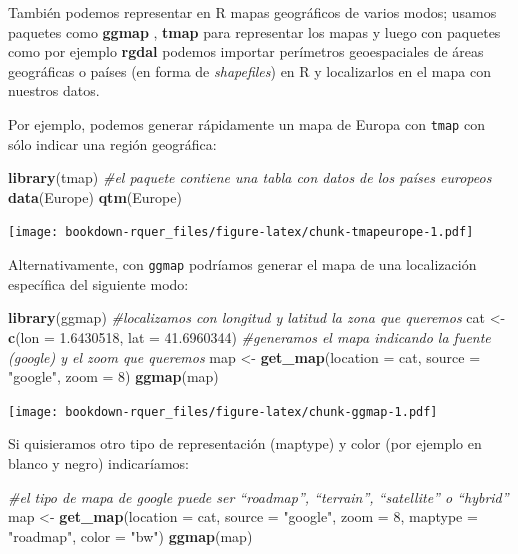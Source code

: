 \documentclass[]{book}
\newenvironment{Shaded}{\begin{snugshade}}{\end{snugshade}}
\newcommand{\CommentTok}[1]{\textcolor[rgb]{0.56,0.35,0.01}{\textit{#1}}}
\newcommand{\DataTypeTok}[1]{\textcolor[rgb]{0.13,0.29,0.53}{#1}}
\newcommand{\DecValTok}[1]{\textcolor[rgb]{0.00,0.00,0.81}{#1}}
\newcommand{\FloatTok}[1]{\textcolor[rgb]{0.00,0.00,0.81}{#1}}
\newcommand{\KeywordTok}[1]{\textcolor[rgb]{0.13,0.29,0.53}{\textbf{#1}}}
\newcommand{\NormalTok}[1]{#1}
\newcommand{\StringTok}[1]{\textcolor[rgb]{0.31,0.60,0.02}{#1}}
\theoremstyle{definition}
\theoremstyle{definition}
\theoremstyle{definition}
\theoremstyle{remark}
\begin{document}
También podemos representar en R mapas geográficos de varios modos;
usamos paquetes como \textbf{ggmap} \citep{R-ggmap}, \textbf{tmap}
\citep{R-tmap} para representar los mapas y luego con paquetes como por
ejemplo \textbf{rgdal} \citep{R-rgdal} podemos importar perímetros
geoespaciales de áreas geográficas o países (en forma de
\emph{shapefiles}) en R y localizarlos en el mapa con nuestros datos.

Por ejemplo, podemos generar rápidamente un mapa de Europa con
\texttt{tmap} con sólo indicar una región geográfica:

\begin{Shaded}
\begin{Highlighting}[]
\KeywordTok{library}\NormalTok{(tmap)}
\CommentTok{#el paquete contiene una tabla con datos de los países europeos }
\KeywordTok{data}\NormalTok{(Europe)}
\KeywordTok{qtm}\NormalTok{(Europe)}
\end{Highlighting}
\end{Shaded}

\texttt{[image: bookdown-rquer\_files/figure-latex/chunk-tmapeurope-1.pdf]}

Alternativamente, con \texttt{ggmap} podríamos generar el mapa de una
localización específica del siguiente modo:

\begin{Shaded}
\begin{Highlighting}[]
\KeywordTok{library}\NormalTok{(ggmap)}
\CommentTok{#localizamos con longitud y latitud la zona que queremos}
\NormalTok{cat <-}\StringTok{ }\KeywordTok{c}\NormalTok{(}\DataTypeTok{lon =} \FloatTok{1.6430518}\NormalTok{, }\DataTypeTok{lat =} \FloatTok{41.6960344}\NormalTok{)}
\CommentTok{#generamos el mapa indicando la fuente (google) y el zoom que queremos}
\NormalTok{map <-}\StringTok{ }\KeywordTok{get_map}\NormalTok{(}\DataTypeTok{location =}\NormalTok{ cat, }\DataTypeTok{source =} \StringTok{"google"}\NormalTok{, }\DataTypeTok{zoom =} \DecValTok{8}\NormalTok{)}
\KeywordTok{ggmap}\NormalTok{(map)}
\end{Highlighting}
\end{Shaded}

\texttt{[image: bookdown-rquer\_files/figure-latex/chunk-ggmap-1.pdf]}

Si quisieramos otro tipo de representación (maptype) y color (por
ejemplo en blanco y negro) indicaríamos:

\begin{Shaded}
\begin{Highlighting}[]
\CommentTok{#el tipo de mapa de google puede ser “roadmap”, “terrain”, “satellite” o “hybrid”}
\NormalTok{map <-}\StringTok{ }\KeywordTok{get_map}\NormalTok{(}\DataTypeTok{location =}\NormalTok{ cat, }\DataTypeTok{source =} \StringTok{"google"}\NormalTok{, }\DataTypeTok{zoom =} \DecValTok{8}\NormalTok{, }\DataTypeTok{maptype =} \StringTok{"roadmap"}\NormalTok{, }\DataTypeTok{color =} \StringTok{"bw"}\NormalTok{)}
\KeywordTok{ggmap}\NormalTok{(map)}
\end{Highlighting}
\end{Shaded}
\end{document}
